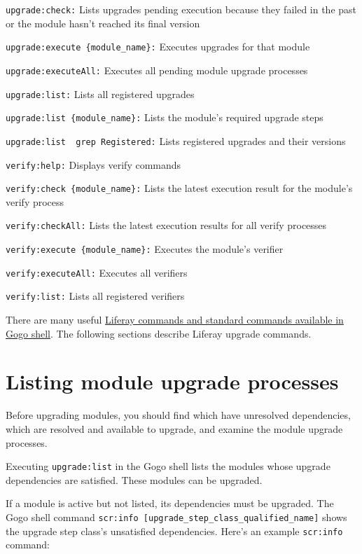 \texttt{upgrade:check:} Lists upgrades pending execution because they
failed in the past or the module hasn't reached its final version

\texttt{upgrade:execute\ \{module\_name\}:} Executes upgrades for that
module

\texttt{upgrade:executeAll:} Executes all pending module upgrade
processes

\texttt{upgrade:list:} Lists all registered upgrades

\texttt{upgrade:list\ \{module\_name\}:} Lists the module's required
upgrade steps

\texttt{upgrade:list\ \textbar{}\ grep\ Registered:} Lists registered
upgrades and their versions

\texttt{verify:help:} Displays verify commands

\texttt{verify:check\ \{module\_name\}:} Lists the latest execution
result for the module's verify process

\texttt{verify:checkAll:} Lists the latest execution results for all
verify processes

\texttt{verify:execute\ \{module\_name\}:} Executes the module's
verifier

\texttt{verify:executeAll:} Executes all verifiers

\texttt{verify:list:} Lists all registered verifiers

There are many useful
\href{/docs/7-2/customization/-/knowledge_base/c/using-the-felix-gogo-shell}{Liferay
commands and standard commands available in Gogo shell}. The following
sections describe Liferay upgrade commands.

\section{Listing module upgrade
processes}\label{listing-module-upgrade-processes}

Before upgrading modules, you should find which have unresolved
dependencies, which are resolved and available to upgrade, and examine
the module upgrade processes.

Executing \texttt{upgrade:list} in the Gogo shell lists the modules
whose upgrade dependencies are satisfied. These modules can be upgraded.

If a module is active but not listed, its dependencies must be upgraded.
The Gogo shell command
\texttt{scr:info\ {[}upgrade\_step\_class\_qualified\_name{]}} shows the
upgrade step class's unsatisfied dependencies. Here's an example
\texttt{scr:info} command:

